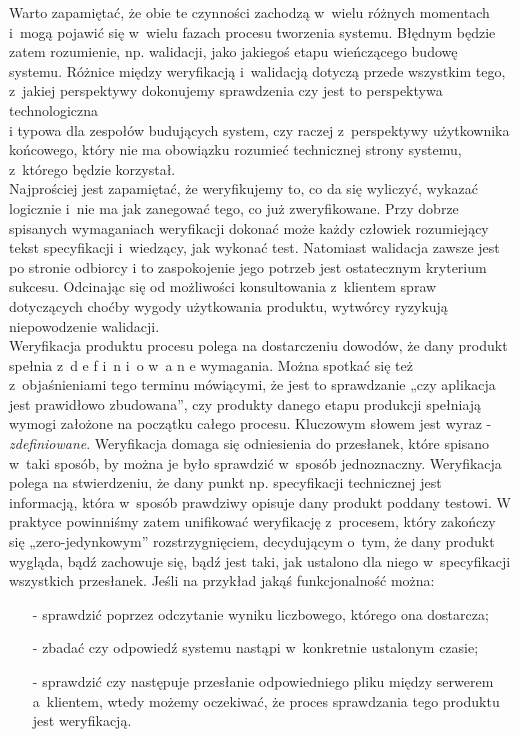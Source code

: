 \documentclass[brudnopis]{xmgr}
\begin{document}
\textcolor{sb}{Warto zapamiętać, że obie te czynności zachodzą w~wielu różnych momentach i~mogą pojawić się w~wielu fazach procesu tworzenia systemu.} \textcolor{sa}{Błędnym będzie zatem rozumienie, np. walidacji, jako jakiegoś etapu wieńczącego budowę systemu.} \textcolor{sb}{Różnice między weryfikacją i~walidacją dotyczą przede wszystkim tego, z~jakiej perspektywy dokonujemy sprawdzenia} \textcolor{sa}{czy jest to perspektywa technologiczna
\\
i typowa dla zespołów budujących system, czy raczej z~perspektywy użytkownika końcowego, który nie ma obowiązku rozumieć technicznej strony systemu, z~którego będzie korzystał.}
\\
\indent \textcolor{sb}{Najprościej jest zapamiętać, że weryfikujemy to,} \textcolor{sa}{co da się wyliczyć, wykazać logicznie i~nie ma jak zanegować tego, co już zweryfikowane.} \textcolor{sb}{Przy dobrze spisanych wymaganiach} \textcolor{sa}{weryfikacji dokonać może każdy człowiek rozumiejący tekst specyfikacji i~wiedzący, jak wykonać test. }
\textcolor{sb}{Natomiast walidacja zawsze jest po stronie odbiorcy i} \textcolor{sa}{to zaspokojenie jego potrzeb jest ostatecznym kryterium sukcesu.} \textcolor{sb}{Odcinając się od możliwości konsultowania z~klientem spraw dotyczących choćby wygody użytkowania produktu,} \textcolor{sa}{wytwórcy ryzykują niepowodzenie walidacji.}
\\
\indent \textcolor{sb}{Weryfikacja produktu procesu} \textcolor{sa}{polega na dostarczeniu dowodów, że dany produkt spełnia z~d e f i~n i~o w~a n e wymagania.} \textcolor{sb}{Można spotkać się też z~objaśnieniami tego terminu mówiącymi, że} \textcolor{sa}{jest to sprawdzanie „czy aplikacja jest prawidłowo zbudowana”, czy produkty danego etapu produkcji spełniają wymogi założone na początku całego procesu.}
\textcolor{sb}{Kluczowym słowem jest wyraz -  \textit{zdefiniowane}.} \textcolor{sa}{Weryfikacja domaga się odniesienia do przesłanek, które spisano w~taki sposób, by można je było sprawdzić w~sposób jednoznaczny.} \textcolor{sb}{Weryfikacja polega na stwierdzeniu, że dany punkt np. specyfikacji technicznej jest informacją,} \textcolor{sa}{która w~sposób prawdziwy opisuje dany produkt poddany testowi.} \textcolor{sb}{W praktyce powinniśmy zatem unifikować weryfikację z~procesem, który zakończy się „zero-jedynkowym” rozstrzygnięciem,} \textcolor{sa}{decydującym o~tym, że dany produkt wygląda, bądź zachowuje się, bądź jest taki, jak ustalono dla niego w~specyfikacji wszystkich przesłanek.} \textcolor{sb}{Jeśli na przykład jakąś funkcjonalność można:}
\begin{itemize}
  \item[-] \textcolor{sa}{sprawdzić poprzez odczytanie wyniku liczbowego, którego ona dostarcza; }
  \item[-] \textcolor{sa}{zbadać czy odpowiedź systemu nastąpi w~konkretnie ustalonym czasie;}
  \item[-] \textcolor{sa}{sprawdzić czy następuje przesłanie odpowiedniego pliku między serwerem a~klientem,
wtedy możemy oczekiwać, że proces sprawdzania tego produktu jest weryfikacją.}
\end{itemize}
\end{document}
